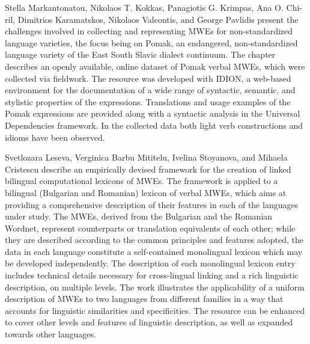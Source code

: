 \begin{refsection}
Stella   Markantonatou,  Nikolaos T. Kokkas,  Panagiotis  G. Krimpas,   Ana O. 
Chi-ril, Dimitrios Karamatskos, Nikolaos Valeontis, and George Pavlidis present the challenges involved in collecting and representing MWEs for non-standardized language varieties, the focus being on Pomak, an endangered, non-standardized language variety of the East South Slavic dialect continuum. The chapter describes an openly available, online dataset of Pomak verbal MWEs, which were collected via fieldwork. The resource was developed with IDION, a web-based environment for the documentation of a wide range of syntactic, semantic, and stylistic properties of the expressions. Translations and usage examples of the Pomak expressions are provided along with a syntactic analysis in the Universal Dependencies framework. In the collected data both light verb constructions and idioms have been observed. %

Svetlozara Leseva, Verginica Barbu Mititelu, Ivelina Stoyanova, and Mihaela Cristescu describe an empirically devised framework for the creation of 
linked bilingual 
computational  
lexicons of MWEs. The framework is applied to a bilingual (Bulgarian and Romanian) lexicon of verbal   MWEs, which aims at providing a comprehensive description of their features in each of the languages under study. The MWEs, derived from the Bulgarian and the Romanian Wordnet, represent counterparts or translation equivalents of each other; while they are described according to the common principles and features adopted, the data in each language constitute a self-contained monolingual lexicon which may be developed independently. The description of each monolingual lexicon entry includes technical details necessary for cross-lingual linking and a rich linguistic description, on multiple levels. 
The work illustrates the applicability of a uniform description of MWEs to two languages from different families in a way that accounts for linguistic similarities and specificities. The resource can be enhanced to cover other levels and features of linguistic description, as well as expanded towards other languages.


\end{refsection}
